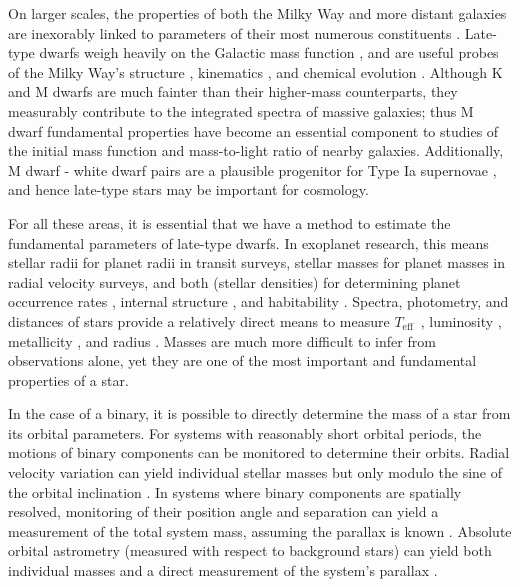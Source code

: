 \documentclass[twocolumn]{aastex62}
\newcommand\teff{\ensuremath{T_\text{eff}}}
\begin{document}
On larger scales, the properties of both the Milky Way and more distant galaxies are inexorably linked to parameters of their most numerous constituents \citep[$>70$\% of stars in the Solar neighborhood are M dwarfs,][]{Henry:1994fk,Reid:2004lr}. Late-type dwarfs weigh heavily on the Galactic mass function \citep[e.g.,][]{Covey:2008lr}, and are useful probes of the Milky Way's structure \citep[e.g.,][]{2008ApJ...673..864J,2017ApJ...843..141F}, kinematics \citep[e.g.,][]{2007AJ....134.2418B,2015RAA....15..860Y}, and chemical evolution \citep{Woolf:2012lr,2015AJ....149..140H}. Although K and M dwarfs are much fainter than their higher-mass counterparts, they measurably contribute to the integrated spectra of massive galaxies; thus M dwarf fundamental properties have become an essential component to studies of the initial mass function \citep[e.g.,][]{2012ApJ...747...69C,2016ApJ...821...39M} and mass-to-light ratio \citep{2015MNRAS.452L..21S} of nearby galaxies. Additionally, M dwarf - white dwarf pairs are a plausible progenitor for Type Ia supernovae \citep{2012ApJ...758..123W}, and hence late-type stars may be important for cosmology.

For all these areas, it is essential that we have a method to estimate the fundamental parameters of late-type dwarfs. In exoplanet research, this means stellar radii for planet radii in transit surveys, stellar masses for planet masses in radial velocity surveys, and both (stellar densities) for determining planet occurrence rates \citep[e.g.,][]{2010exop.book...55W,Gaidos2013}, internal structure \citep[e.g.,][]{Rogers:2011lr}, and habitability \citep[e.g.,][]{Gaidos2013a,Kane2017}. Spectra, photometry, and distances of stars provide a relatively direct means to measure \teff\ \citep[e.g.,][]{Rojas-Ayala:2012uq,Mann2013c}, luminosity \citep[e.g.,][]{2002AJ....124.2721R}, metallicity \citep[e.g.,][]{Bonfils:2005,RojasAyala:2010}, and radius \citep[e.g., via Stefan-Boltzmann, ][]{Newton2015A,Kesseli2018b}. Masses are much more difficult to infer from observations alone, yet they are one of the most important and fundamental properties of a star.  

In the case of a binary, it is possible to directly determine the mass of a star from its orbital parameters. For systems with reasonably short orbital periods, the motions of binary components can be monitored to determine their orbits. Radial velocity variation can yield individual stellar masses but only modulo the sine of the orbital inclination \citep[e.g.,][]{Torres2002,Kraus2011,Stevens:2018aa}. In systems where binary components are spatially resolved, monitoring of their position angle and separation can yield a measurement of the total system mass, assuming the parallax is known \citep[e.g.,][]{Soderhjelm1999,Woi2003,2009ApJ...699..168D}. Absolute orbital astrometry (measured with respect to background stars) can yield both individual masses and a direct measurement of the system's parallax \citep[e.g.,][]{Koh2012,Benedict2016}. 
\end{document}
